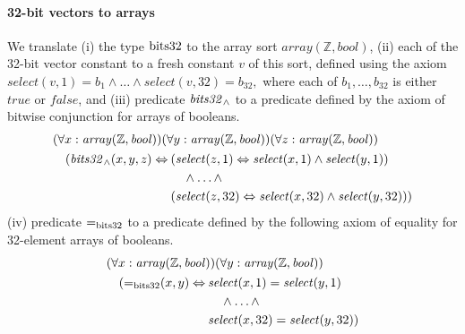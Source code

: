 \paragraph{32-bit vectors to arrays}
We translate
(i) the type $\mathrm{bits32}$ to the array sort $\mathit{array}(\mathbb{Z},\mathit{bool})$,
(ii) each of the 32-bit vector constant to a fresh constant $v$ of this sort, defined using the axiom $\mathit{select}(v,1)=b_1\wedge\ldots\wedge\allowbreak\mathit{select}(v, 32)=b_{32},$ where each of $b_1,\ldots,b_{32}$ is either $\mathit{true}$ or $\mathit{false}$, and
(iii) predicate $\mathit{bits32}_\wedge$ to a predicate defined by the axiom of bitwise conjunction for arrays of booleans.
\begin{equation*}
\begin{aligned}
&(\forall x:\mathit{array}(\mathbb{Z},\mathit{bool}))(\forall y:\mathit{array}(\mathbb{Z},\mathit{bool}))(\forall z:\mathit{array}(\mathbb{Z},\mathit{bool}))\\
&\quad\begin{aligned}
      (\mathit{bits32}_\wedge(x,y,z)\Leftrightarrow\:&(\mathit{select}(z,1)\Leftrightarrow\mathit{select}(x,1)\wedge\mathit{select}(y,1))\\
      &\quad\wedge\ldots\wedge\:\\
      &(\mathit{select}(z,32)\Leftrightarrow\mathit{select}(x,32)\wedge\mathit{select}(y,32)))
      \end{aligned}
\end{aligned}
\end{equation*}
(iv) predicate $\mathit{=}_{\mathrm{bits32}}$ to a predicate defined by the following axiom of equality for 32-element arrays of booleans.
\begin{equation*}
\begin{aligned}
&(\forall x:\mathit{array}(\mathbb{Z},\mathit{bool}))(\forall y:\mathit{array}(\mathbb{Z},\mathit{bool}))\\
&\quad\begin{aligned}
      (\mathit{=}_{\mathrm{bits32}}(x, y)\Leftrightarrow\:&\mathit{select}(x,1)=\mathit{select}(y,1)\\
      &\quad\wedge\ldots\wedge\:\\
      &\mathit{select}(x, 32)=\mathit{select}(y,32))
      \end{aligned}
\end{aligned}
\end{equation*}


